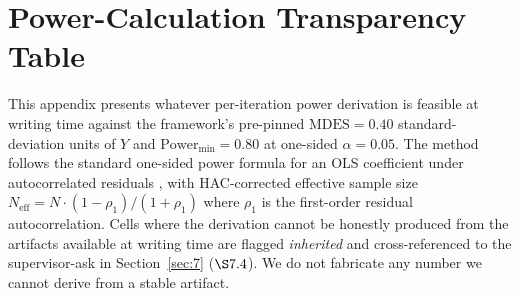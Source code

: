 \section{Power-Calculation Transparency Table}\label{app:D}

This appendix presents whatever per-iteration power derivation is
feasible at writing time against the framework's pre-pinned
\(\mathrm{MDES} = 0.40\) standard-deviation units of \(Y\) and
\(\mathrm{Power}_{\min} = 0.80\) at one-sided \(\alpha = 0.05\). The
method follows the standard one-sided power formula for an OLS
coefficient under autocorrelated residuals \citep[\S 6.18]{hansen2022},
with HAC-corrected effective sample size
\(N_{\mathrm{eff}} = N \cdot (1 - \rho_1)/(1 + \rho_1)\) where
\(\rho_1\) is the first-order residual autocorrelation. Cells where
the derivation cannot be honestly produced from the artifacts available
at writing time are flagged \emph{inherited} and cross-referenced to
the supervisor-ask in Section~\ref{sec:7} (\(\S 7.4\)). We do not
fabricate any number we cannot derive from a stable artifact.

